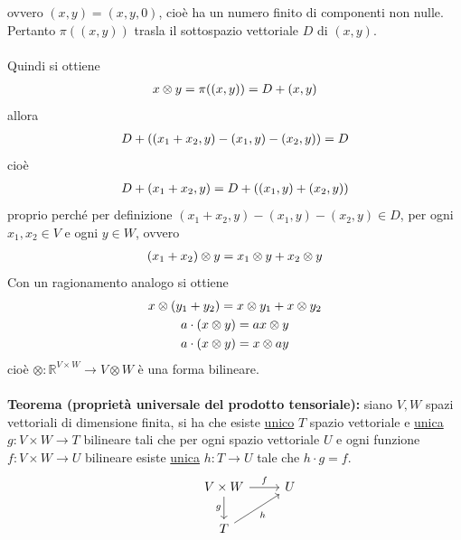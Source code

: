 \documentclass{article}
\begin{document}
ovvero $(x, y) = (x, y, 0)$, cioè ha un numero finito di componenti non nulle. Pertanto $\pi ((x, y))$ trasla il sottospazio vettoriale $D$ di $(x, y)$. \\ \\
Quindi si ottiene
\begin{gather}
    x \otimes y = \pi((x, y)) = D + (x, y) \notag
\end{gather}
allora
\begin{gather}
    D + ((x_1 + x_2, y) - (x_1, y) - (x_2, y)) = D \notag
\end{gather}
cioè
\begin{gather}
    D + (x_1 + x_2, y) = D + ((x_1, y) + (x_2, y)) \notag
\end{gather}
proprio perché per definizione $(x_1 + x_2, y) - (x_1, y) - (x_2, y) \in D$, per ogni $x_1, x_2 \in V$ e ogni $y \in W$, ovvero
\begin{gather}
    (x_1 + x_2) \otimes y = x_1 \otimes y + x_2 \otimes y \notag
\end{gather}
Con un ragionamento analogo si ottiene
\begin{gather}
    x \otimes (y_1 + y_2) = x \otimes y_1 + x \otimes y_2 \notag \\
    a \cdot (x \otimes y) = ax \otimes y \notag \\
    a \cdot (x \otimes y) = x \otimes ay \notag
\end{gather}
cioè $\otimes : \mathbb{R}^{V \times W} \longrightarrow V \otimes W$ è una forma bilineare. \\ \\
\textbf{Teorema (proprietà universale del prodotto tensoriale):} siano $V, W$ spazi vettoriali di dimensione finita, si ha che esiste \underline{unico} $T$ spazio vettoriale e \underline{unica} $g : V \times W \longrightarrow T$ bilineare tali che per ogni spazio vettoriale $U$ e ogni funzione $f : V \times W \longrightarrow U$ bilineare esiste \underline{unica} $h : T \longrightarrow U$ tale che $h \cdot g = f$. \\
\[
\begin{tikzcd}
&V \times W \arrow[r,"f"] \arrow[d,"g", swap] & U \\
&T \arrow[ur, "h", swap] 
\end{tikzcd}
\]
\end{document}

